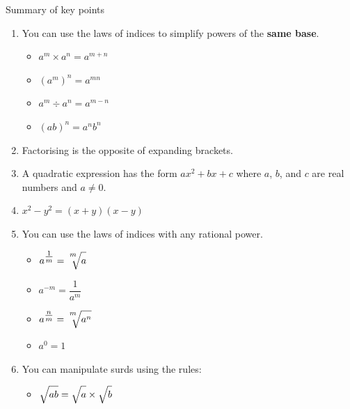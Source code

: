 \documentclass[fleqn]{article}
\begin{document}
\begin{mybox2}[colbacktitle=green]{Summary of key points}
	\begin{enumerate}
		\item You can use the laws of indices to simplify powers of the \textbf{same base}.
			\begin{multicols}{2}
				\begin{itemize}
					\item $a^m\times a^n = a^{m+n}$
					\item $(a^m)^n = a^{mn}$	
				\end{itemize}
				\columnbreak
				\begin{itemize}
					\setlength{\itemsep}{-3pt}
					\item $a^m\div a^n = a^{m-n}$
					\item $(ab)^n = a^nb^n$
				\end{itemize}
			\end{multicols}
		\item Factorising is the opposite of expanding brackets.
		\item A quadratic expression has the form $ax^2+bx+c$ where $a$, $b$, and $c$ are real numbers and $a\neq0$.
		\item $x^2-y^2=(x+y)(x-y)$
		\item You can use the laws of indices with any rational power.
			\begin{multicols}{2}
				\begin{itemize}
					\item $a^{\textstyle\frac{1}{m}}=\sqrt[\textstyle{^m}]{\strut a}$
					\item $a^{-m}=\dfrac{1}{a^m}$	
				\end{itemize}
				\columnbreak
				\begin{itemize}
					\setlength{\itemsep}{-3pt}
					\item $a^{\textstyle\frac{n}{m}}=\sqrt[\textstyle{^m}]{\strut a^n}$
					\item $a^0 = 1$
				\end{itemize}
			\end{multicols}
		\item You can manipulate surds using the rules:
			\begin{multicols}{2}
				\vspace{2mm}
				\begin{itemize}
					\item $\sqrt{\strut ab}=\sqrt{\strut a}\times\sqrt{\strut b}$
				\end{itemize}

\end{multicols}
\end{enumerate}
\end{mybox2}
\end{document}
